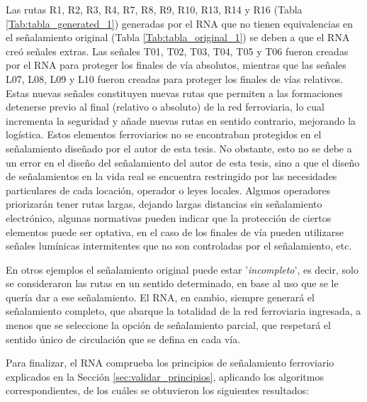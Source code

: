     
    Las rutas R1, R2, R3, R4, R7, R8, R9, R10, R13, R14 y R16 (Tabla \ref{Tab:tabla_generated_1}) generadas por el RNA que no tienen equivalencias en el señalamiento original (Tabla \ref{Tab:tabla_original_1}) se deben a que el RNA creó señales extras. Las señales T01, T02, T03, T04, T05 y T06 fueron creadas por el RNA para proteger los finales de vía absolutos, mientras que las señales L07, L08, L09 y L10 fueron creadas para proteger los finales de vías relativos. Estas nuevas señales constituyen nuevas rutas que permiten a las formaciones detenerse previo al final (relativo o absoluto) de la red ferroviaria, lo cual incrementa la seguridad y añade nuevas rutas en sentido contrario, mejorando la logística. Estos elementos ferroviarios no se encontraban protegidos en el señalamiento diseñado por el autor de esta tesis. No obstante, esto no se debe a un error en el diseño del señalamiento del autor de esta tesis, sino a que el diseño de señalamientos en la vida real se encuentra restringido por las necesidades particulares de cada locación, operador o leyes locales. Algunos operadores priorizarán tener rutas largas, dejando largas distancias sin señalamiento electrónico, algunas normativas pueden indicar que la protección de ciertos elementos puede ser optativa, en el caso de los finales de vía pueden utilizarse señales lumínicas intermitentes que no son controladas por el señalamiento, etc.
    
    En otros ejemplos el señalamiento original puede estar '\textit{incompleto}', es decir, solo se consideraron las rutas en un sentido determinado, en base al uso que se le quería dar a ese señalamiento. El RNA, en cambio, siempre generará el señalamiento completo, que abarque la totalidad de la red ferroviaria ingresada, a menos que se seleccione la opción de señalamiento parcial, que respetará el sentido único de circulación que se defina en cada vía.    
    
    Para finalizar, el RNA comprueba los principios de señalamiento ferroviario explicados en la Sección \ref{sec:validar_principios}, aplicando los algoritmos correspondientes, de los cuáles se obtuvieron los siguientes resultados:
    
